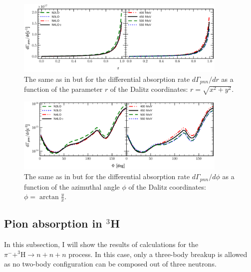    \begin{figure}[h]
        \begin{center}
        \includegraphics[width=0.9\textwidth]{PlotData/PION/Dalitz_maps/figures/3HE_dGdr.pdf}
        \end{center}
        \caption{The same as in  but for the differential absorption rate $d\Gamma_{pnn} /dr$
        as a function of the parameter $r$ of the Dalitz coordinates: $r = \sqrt{x^2 + y^2}$.}
        \label{pion_dGdEr}
    \end{figure}

    \begin{figure}[h]
        \begin{center}
        \includegraphics[width=0.9\textwidth]{PlotData/PION/Dalitz_maps/figures/3HE_dGdphi.pdf}
        \end{center}
        \caption{The same as in  but for the differential absorption rate $d\Gamma_{pnn} /d\phi$
        as a function of the azimuthal angle $\phi$ of the Dalitz coordinates: $\phi = \arctan \frac{y}{x}$.}
        \label{pion_dGdphi}
    \end{figure}


    \clearpage
    \subsection{Pion absorption in $^3$H}

    In this subsection, I will show the results of calculations for
    the $\pi^- + ^3\text{H} \rightarrow n + n + n$ process.
    In this case, only a three-body breakup is allowed as 
    no two-body configuration can be composed out of three neutrons.
    

